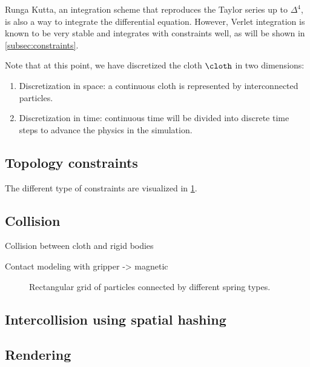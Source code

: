 \documentclass[\home/main.tex]{subfiles}
\begin{document}
Runga Kutta, an integration scheme that reproduces the Taylor series up to $\Delta^4$, is also a way to integrate the differential equation. However, Verlet integration is known to be very stable \autocite{Jakobsen} and integrates with constraints well, as will be shown in \cref{subsec:constraints}.  


 
Note that at this point, we have discretized the cloth $\cloth$ in two dimensions:
\begin{enumerate}
    \item Discretization in space: a continuous cloth is represented by interconnected particles.
    \item Discretization in time: continuous time will be divided into discrete time steps to advance the physics in the simulation.
\end{enumerate}

\subsection{Topology constraints} \label{subsec:sim_topology_cloth}
The different type of constraints are visualized in \cref{fig:topology_cloth}.

\subsection{Collision}
Collision between cloth and rigid bodies

Contact modeling with gripper -> magnetic

\begin{figure}[htb]
    
    \label{fig:topology_cloth}
    \caption[Rectangular grid of particles connected by different spring types.]{Rectangular grid of particles connected by different spring types.}
\end{figure}

\subsection{Intercollision using spatial hashing}

\subsection{Rendering}
\end{document}
